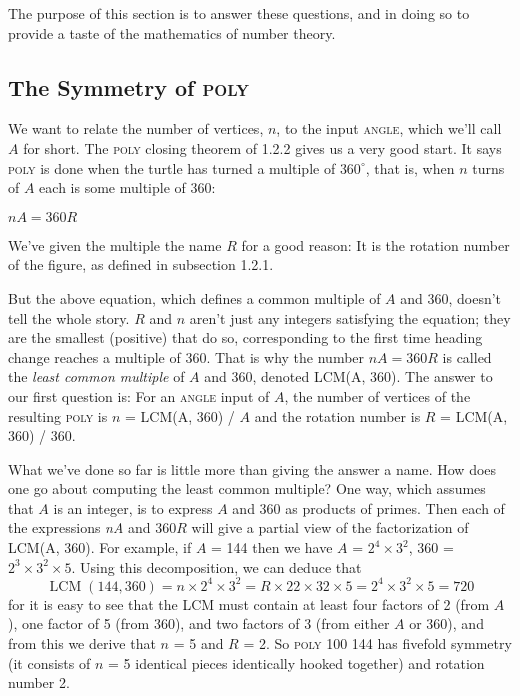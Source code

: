 \documentclass{book}
\begin{document}
The purpose of this section is to answer these questions, and in doing so
to provide a taste of the mathematics of number theory.

\subsection{The Symmetry of \textsc{poly}}

We want to relate the number of vertices, $n$, to the input \textsc{angle}, which
we'll call $A$ for short. The \textsc{poly} closing theorem of 1.2.2 gives us a very
good start. It says \textsc{poly} is done when the turtle has turned a multiple
of $360^{\circ}$, that is, when $n$ turns of $A$ each is some multiple of 360:

$nA = 360R$

We've given the multiple the name $R$ for a good reason: It is the rotation
number of the figure, as defined in subsection 1.2.1.

But the above equation, which defines a common multiple of $A$ and
360, doesn't tell the whole story. $R$ and $n$ aren't just any integers
satisfying the equation; they are the smallest (positive) that do so,
corresponding to the first time heading change reaches a multiple of 360.
That is why the number $nA=360R$ is called the {\em least common multiple}
of $A$ and 360, denoted LCM(A, 360). The answer to our first question is:
For an \textsc{angle} input of $A$, the number of vertices of the resulting \textsc{poly} is
$n$ = LCM(A, 360) / $A$ and the rotation number is $R$ = LCM(A, 360) / 360.

What we've done so far is little more than giving the answer a name.
How does one go about computing the least common multiple? One way,
which assumes that $A$ is an integer, is to express $A$ and 360 as products
of primes. Then each of the expressions {\em nA} and 360$R$ will give a partial
view of the factorization of LCM(A, 360). For example, if $A$ = 144 then
we have $A$ = $2^4 \times  3^2$, 360 = $2^3 \times 3^2 \times 5$. Using this decomposition, we
can deduce that
$$\operatorname{LCM}(144,360) = n \times 2^4 \times 3^2 = R \times 22 \times 32 \times 5 = 2^4 \times 3^2 \times 5 = 720$$
\noindent for it is easy to see that the LCM must contain at least four factors
of 2 (from $A$), one factor of 5 (from 360), and two factors of 3 (from
either $A$ or 360), and from this we derive that $n$ = 5 and $R$ = 2.
So \textsc{poly 100 144} has fivefold symmetry (it consists of $n$ = 5 identical
pieces identically hooked together) and rotation number 2.
\end{document}
